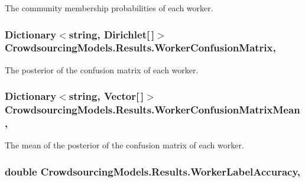 The community membership probabilities of each worker. 

\hypertarget{class_crowdsourcing_models_1_1_results_aeacd6050969e57759ccefe7760abfdff}{}
\subsubsection[{Worker\+Confusion\+Matrix}]{\setlength{\rightskip}{0pt plus 5cm}Dictionary$<$string, Dirichlet\mbox{[}$\,$\mbox{]}$>$ Crowdsourcing\+Models.\+Results.\+Worker\+Confusion\+Matrix\hspace{0.3cm}{\ttfamily [get]}, {}}\label{class_crowdsourcing_models_1_1_results_aeacd6050969e57759ccefe7760abfdff}


The posterior of the confusion matrix of each worker. 

\hypertarget{class_crowdsourcing_models_1_1_results_a3f83c2aa1c8067278b72de879e2683df}{}
\subsubsection[{Worker\+Confusion\+Matrix\+Mean}]{\setlength{\rightskip}{0pt plus 5cm}Dictionary$<$string, Vector\mbox{[}$\,$\mbox{]}$>$ Crowdsourcing\+Models.\+Results.\+Worker\+Confusion\+Matrix\+Mean\hspace{0.3cm}{\ttfamily [get]}, {}}\label{class_crowdsourcing_models_1_1_results_a3f83c2aa1c8067278b72de879e2683df}


The mean of the posterior of the confusion matrix of each worker. 

\hypertarget{class_crowdsourcing_models_1_1_results_aab75338f84a6d1110365817b68691d4f}{}
\subsubsection[{Worker\+Label\+Accuracy}]{\setlength{\rightskip}{0pt plus 5cm}double Crowdsourcing\+Models.\+Results.\+Worker\+Label\+Accuracy\hspace{0.3cm}{\ttfamily [get]}, {}}\label{class_crowdsourcing_models_1_1_results_aab75338f84a6d1110365817b68691d4f}


